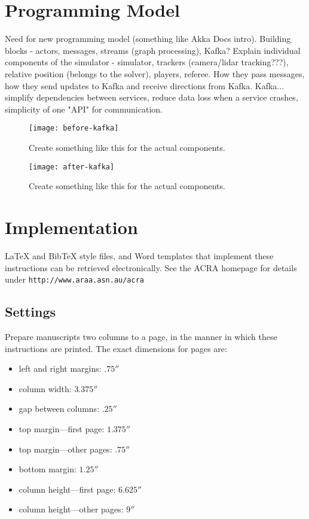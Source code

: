 \documentclass{article}
\begin{document}
\section{Programming Model}
Need for new programming model (something like Akka Docs intro).
Building blocks - actors, messages, streams (graph processing), Kafka?
Explain individual components of the simulator - simulator, trackers (camera/lidar tracking???), relative position (belongs to the solver), players, referee. How they pass messages, how they send updates to Kafka and receive directions from Kafka.
Kafka... simplify dependencies between services, reduce data loss when a service crashes, simplicity of one "API" for communication.

\begin{figure}
	\centering
	\texttt{[image: before-kafka]}
	\caption{Create something like this for the actual components.}\label{fig:before-kafka}
\end{figure}

\begin{figure}
	\centering
	\texttt{[image: after-kafka]}
	\caption{Create something like this for the actual components.}\label{fig:after-kafka}
\end{figure}



\section{Implementation}

\LaTeX{} and Bib\TeX{} style files, and Word templates that implement these 
instructions can be retrieved electronically.  See the ACRA homepage for 
details under
\verb+http://www.araa.asn.au/acra+

\subsection{Settings}

Prepare manuscripts two columns to a page, in the manner in which these
instructions are printed.  The exact dimensions for pages are:
\begin{itemize}
\item left and right margins: $.75''$
\item column width: $3.375''$
\item gap between columns: $.25''$
\item top margin---first page: $1.375''$
\item top margin---other pages: $.75''$
\item bottom margin: $1.25''$
\item column height---first page: $6.625''$
\item column height---other pages: $9''$
\end{itemize}
\end{document}
